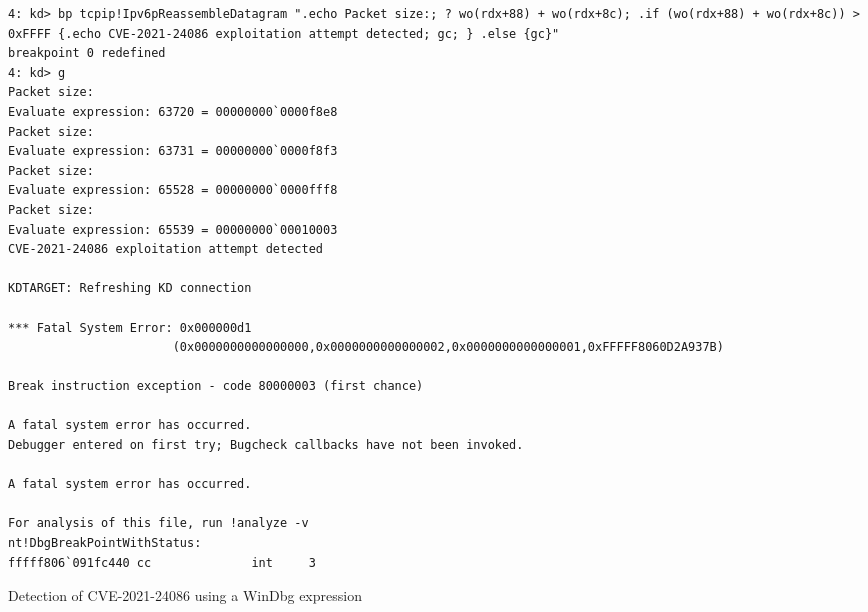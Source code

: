 \documentclass{report}
\begin{document}
\begin{listing}[H]
    \begin{verbatim}
4: kd> bp tcpip!Ipv6pReassembleDatagram ".echo Packet size:; ? wo(rdx+88) + wo(rdx+8c); .if (wo(rdx+88) + wo(rdx+8c)) > 0xFFFF {.echo CVE-2021-24086 exploitation attempt detected; gc; } .else {gc}"
breakpoint 0 redefined
4: kd> g
Packet size:
Evaluate expression: 63720 = 00000000`0000f8e8
Packet size:
Evaluate expression: 63731 = 00000000`0000f8f3
Packet size:
Evaluate expression: 65528 = 00000000`0000fff8
Packet size:
Evaluate expression: 65539 = 00000000`00010003
CVE-2021-24086 exploitation attempt detected

KDTARGET: Refreshing KD connection

*** Fatal System Error: 0x000000d1
                       (0x0000000000000000,0x0000000000000002,0x0000000000000001,0xFFFFF8060D2A937B)

Break instruction exception - code 80000003 (first chance)

A fatal system error has occurred.
Debugger entered on first try; Bugcheck callbacks have not been invoked.

A fatal system error has occurred.

For analysis of this file, run !analyze -v
nt!DbgBreakPointWithStatus:
fffff806`091fc440 cc              int     3
\end{verbatim}
\caption{Detection of CVE-2021-24086 using a WinDbg expression}
\label{listing:detection:hooking:windbg-bp-output}
\end{listing}
\end{document}
